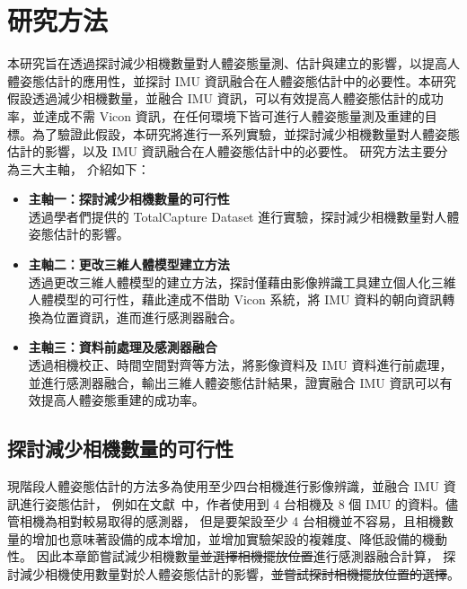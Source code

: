 \chapter{研究方法}
\fontsize{12pt}{18pt}\selectfont

本研究旨在透過探討減少相機數量對人體姿態量測、估計與建立的影響，以提高人體姿態估計的應用性，並探討 IMU 資訊融合在人體姿態估計中的必要性。本研究假設透過減少相機數量，並融合 IMU 資訊，可以有效提高人體姿態估計的成功率，並達成不需 Vicon 資訊，在任何環境下皆可進行人體姿態量測及重建的目標。為了驗證此假設，本研究將進行一系列實驗，並探討減少相機數量對人體姿態估計的影響，以及 IMU 資訊融合在人體姿態估計中的必要性。
研究方法主要分為三大主軸，
介紹如下：
\begin{itemize}
    \item \textbf{主軸一：探討減少相機數量的可行性}
    \\ 透過學者們提供的 TotalCapture Dataset 進行實驗，探討減少相機數量對人體姿態估計的影響。
    \item \textbf{主軸二：更改三維人體模型建立方法}
    \\ 透過更改三維人體模型的建立方法，探討僅藉由影像辨識工具建立個人化三維人體模型的可行性，藉此達成不借助 Vicon 系統，將 IMU 資料的朝向資訊轉換為位置資訊，進而進行感測器融合。
    \item \textbf{主軸三：資料前處理及感測器融合}
    \\ 透過相機校正、時間空間對齊等方法，將影像資料及 IMU 資料進行前處理，並進行感測器融合，輸出三維人體姿態估計結果，證實融合 IMU 資訊可以有效提高人體姿態重建的成功率。
\end{itemize}


\clearpage

\section{探討減少相機數量的可行性}
現階段人體姿態估計的方法多為使用至少四台相機進行影像辨識，並融合 IMU 資訊進行姿態估計，
例如在文獻~\cite{Zhang_2020_CVPR}中，作者使用到 4 台相機及 8 個 IMU 的資料。儘管相機為相對較易取得的感測器，
但是要架設至少 4 台相機並不容易，且相機數量的增加也意味著設備的成本增加，並增加實驗架設的複雜度、降低設備的機動性。
因此本章節嘗試減少相機數量\sout{並選擇相機擺放位置}進行感測器融合計算，
探討減少相機使用數量對於人體姿態估計的影響，\sout{並嘗試探討相機擺放位置的選擇}。


